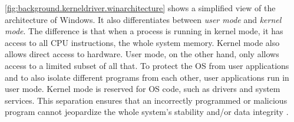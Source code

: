 \autoref{fig:background.kerneldriver.winarchitecture} shows a simplified view of the architecture of Windows. It also differentiates between \emph{user mode} and \emph{kernel mode}. The difference is that when a process is running in kernel mode, it has access to all CPU instructions, the whole system memory. Kernel mode also allows direct access to hardware. User mode, on the other hand, only allows access to a limited subset of all that. To protect the OS from user applications and to also isolate different programs from each other, user applications run in user mode. Kernel mode is reserved for OS code, such as drivers and system services. This separation ensures that an incorrectly programmed or malicious program cannot jeopardize the whole system's stability and/or data integrity \cite{Yosifovich2017}.

\begin{figure}[htb!]
	\center
\end{figure}
